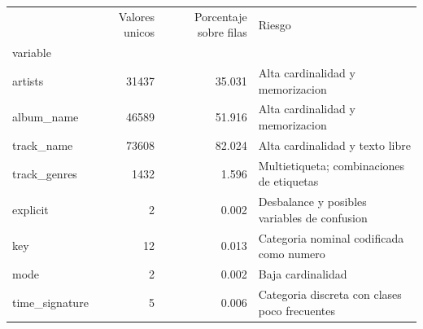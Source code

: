\begin{tabular}{lrrl}
\toprule
 & Valores unicos & Porcentaje sobre filas & Riesgo \\
variable &  &  &  \\
\midrule
artists & 31437 & 35.031 & Alta cardinalidad y memorizacion \\
album\_name & 46589 & 51.916 & Alta cardinalidad y memorizacion \\
track\_name & 73608 & 82.024 & Alta cardinalidad y texto libre \\
track\_genres & 1432 & 1.596 & Multietiqueta; combinaciones de etiquetas \\
explicit & 2 & 0.002 & Desbalance y posibles variables de confusion \\
key & 12 & 0.013 & Categoria nominal codificada como numero \\
mode & 2 & 0.002 & Baja cardinalidad \\
time\_signature & 5 & 0.006 & Categoria discreta con clases poco frecuentes \\
\bottomrule
\end{tabular}
